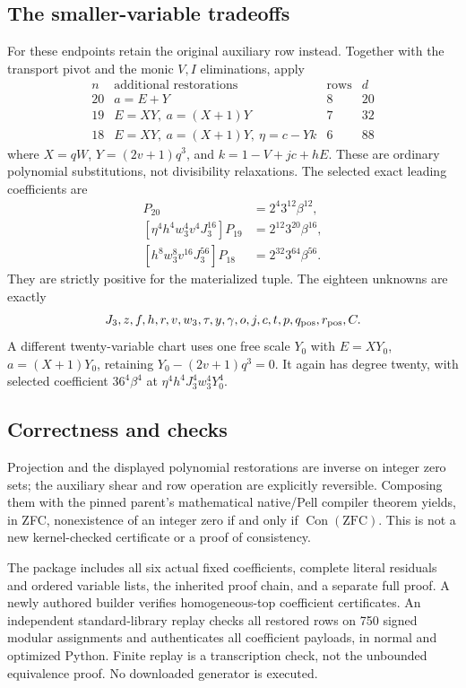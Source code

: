 \subsection{The smaller-variable tradeoffs}
For these endpoints retain the original auxiliary row instead. Together
with the transport pivot and the monic $V,I$ eliminations, apply
\[
\begin{array}{c|l|c|c}
 n&\text{additional restorations}&\text{rows}&d\\\hline
20&a=E+Y&8&20\\
19&E=XY,\ a=(X+1)Y&7&32\\
18&E=XY,\ a=(X+1)Y,\ \eta=c-Yk&6&88
\end{array}
\]
where $X=qW$, $Y=(2v+1)q^3$, and $k=1-V+jc+hE$.
These are ordinary polynomial substitutions, not divisibility
relaxations. The selected exact leading coefficients are
\begin{align*}
[f^4v^4J_3^{12}]P_{20}&=2^4 3^{12}\beta^{12},\\
[\eta^4h^4w_3^4v^4J_3^{16}]P_{19}&=2^{12}3^{20}\beta^{16},\\
[h^8w_3^8v^{16}J_3^{56}]P_{18}&=2^{32}3^{64}\beta^{56}.
\end{align*}
They are strictly positive for the materialized tuple. The eighteen
unknowns are exactly
\[
 J_3,z,f,h,r,v,w_3,\tau,y,\gamma,o,j,c,t,p,q_{\rm pos},r_{\rm pos},C.
\]
A different twenty-variable chart uses one free scale $Y_0$ with
$E=XY_0$, $a=(X+1)Y_0$, retaining
$Y_0-(2v+1)q^3=0$. It again has degree twenty, with selected coefficient
$36^4\beta^4$ at $\eta^4h^4J_3^4w_3^4Y_0^4$.

\subsection{Correctness and checks}
Projection and the displayed polynomial restorations are inverse on
integer zero sets; the auxiliary shear and row operation are explicitly
reversible. Composing them with the pinned parent's mathematical
native/Pell compiler theorem yields, in ZFC, nonexistence of an integer
zero if and only if $\operatorname{Con}(\mathrm{ZFC})$. This is not a
new kernel-checked certificate or a proof of consistency.

The package includes all six actual fixed coefficients, complete
literal residuals and ordered variable lists, the inherited proof
chain, and a separate full proof. A newly authored builder verifies
homogeneous-top coefficient certificates. An independent standard-library
replay checks all restored rows on 750 signed modular assignments and
authenticates all coefficient payloads, in normal and optimized Python.
Finite replay is a transcription check, not the unbounded equivalence
proof. No downloaded generator is executed.

